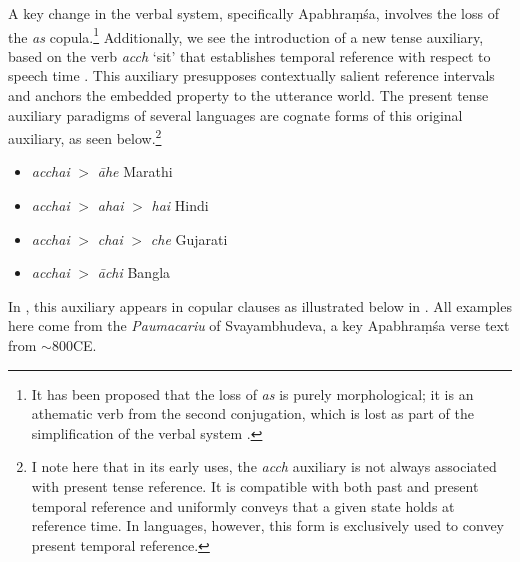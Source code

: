 \documentclass[output=paper,hidelinks]{langscibook}
\begin{document}
\begin{exe}
\begin{xlist}
\begin{xlist}
\begin{exe}
\begin{exe}
\begin{exe}
\begin{exe}
\begin{xlist}
\begin{exe}
\begin{xlist}
\begin{exe}
\begin{xlist}
A key change in the  verbal system, specifically Apa\-bhra\d{m}\-\'{s}a, involves the loss of the  \textit{as} copula.\footnote{It has been proposed that the loss of \emph{as} is purely morphological; it is an athematic verb from the second conjugation, which is lost as part of the simplification of the verbal system \citep[293]{hinuber2001}.} Additionally, we see the introduction of a new tense auxiliary, based on the verb \emph{acch} `sit' that establishes temporal reference with respect to speech time \citep{turner1936}. This auxiliary presupposes contextually salient reference intervals and anchors the embedded property to the utterance world. The present tense auxiliary paradigms of several  languages are cognate forms of this original auxiliary, as seen below.\footnote{I note here that in its early uses, the \textit{acch} auxiliary is not always associated with present tense reference. It is compatible with both past and present temporal reference and uniformly conveys that a given state holds at reference time. In  languages, however, this form is exclusively used to convey present temporal reference.}
 
\begin{itemize}\itemsep=0mm
\item \emph{acchai} $>$ \emph{āhe} \hfill{Marathi}
\item \emph{acchai} $>$ \emph{ahai} $>$ \emph{hai} \hfill{Hindi}
\item \emph{acchai} $>$ \emph{chai} $>$ \emph{che} \hfill{Gujarati}
\item \emph{acchai} $>$ \emph{āchi} \hfill{Bangla}
\end{itemize}

In , this auxiliary appears in copular clauses as illustrated below in . All examples here come from the \emph{Paumacariu} of Svayambhudeva, a key Apabhra\d{m}\'{s}a verse text from $\sim$800CE.



\end{xlist}
\end{exe}
\end{xlist}
\end{exe}
\end{xlist}
\end{exe}
\end{exe}
\end{exe}
\end{exe}
\end{xlist}
\end{xlist}
\end{exe}
\end{document}

